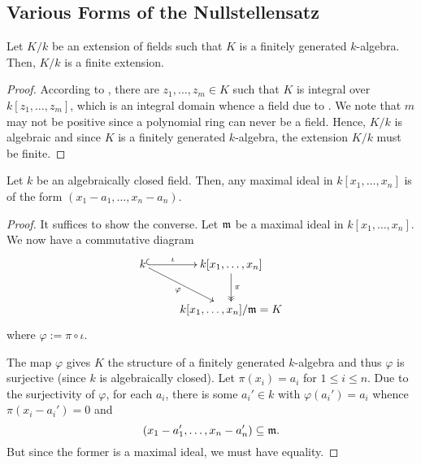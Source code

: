 \subsection{Various Forms of the Nullstellensatz}

\begin{lemma}
    Let $K/k$ be an extension of fields such that $K$ is a finitely generated $k$-algebra. Then, $K/k$ is a finite extension.
\end{lemma}
\begin{proof}
    According to , there are $z_1,\dots,z_m\in K$ such that $K$ is integral over $k[z_1,\dots,z_m]$, which is an integral domain whence a field due to . We note that $m$ may not be positive since a polynomial ring can never be a field. Hence, $K/k$ is algebraic and since $K$ is a finitely generated $k$-algebra, the extension $K/k$ must be finite.
\end{proof}

\begin{theorem}
    Let $k$ be an algebraically closed field. Then, any maximal ideal in $k[x_1,\dots,x_n]$ is of the form $(x_1 - a_1,\dots,x_n - a_n)$.
\end{theorem}
\begin{proof}
    It suffices to show the converse. Let $\mathfrak m$ be a maximal ideal in $k[x_1,\dots,x_n]$. We now have a commutative diagram 
    \begin{equation*}
        \xymatrix {
            k\ar@{^(->}[r]^-{\iota}\ar[rd]_-{\varphi} & k[x_1,\dots,x_n]\ar@{->>}[d]^-{\pi}\\
            & k[x_1,\dots,x_n]/\frakm = K
        }
    \end{equation*}
    where $\varphi := \pi\circ\iota$.

    The map $\varphi$ gives $K$ the structure of a finitely generated $k$-algebra and thus $\varphi$ is surjective (since $k$ is algebraically closed). Let $\pi(x_i) = a_i$ for $1\le i\le n$. Due to the surjectivity of $\varphi$, for each $a_i$, there is some $a_i'\in k$ with $\varphi(a_i') = a_i$ whence $\pi(x_i - a_i') = 0$ and 
    \begin{equation*}
        (x_1 - a_1',\dots,x_n - a_n')\subseteq\mathfrak m.
    \end{equation*}
    But since the former is a maximal ideal, we must have equality.
\end{proof}

